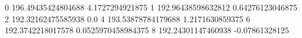 0 196.49435424804688 4.1727294921875
1 192.96438598632812 0.64276123046875
2 192.32162475585938 0.0
4 193.53878784179688 1.2171630859375
6 192.3742218017578 0.0525970458984375
8 192.24301147460938 -0.07861328125
